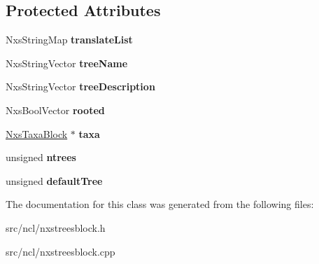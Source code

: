 \subsection*{Protected Attributes}
\begin{DoxyCompactItemize}
\item 
\hypertarget{classNxsTreesBlock_a9b98704435d1d19b44e0413bc683501a}{
NxsStringMap {\bfseries translateList}}
\label{classNxsTreesBlock_a9b98704435d1d19b44e0413bc683501a}

\item 
\hypertarget{classNxsTreesBlock_a783481691f6eb6f76ededc08ef54b88e}{
NxsStringVector {\bfseries treeName}}
\label{classNxsTreesBlock_a783481691f6eb6f76ededc08ef54b88e}

\item 
\hypertarget{classNxsTreesBlock_add8b39382c1adbb4d2be37ddce1d983b}{
NxsStringVector {\bfseries treeDescription}}
\label{classNxsTreesBlock_add8b39382c1adbb4d2be37ddce1d983b}

\item 
\hypertarget{classNxsTreesBlock_a96b97e6ca078dd1405a3bf0a20e3de1f}{
NxsBoolVector {\bfseries rooted}}
\label{classNxsTreesBlock_a96b97e6ca078dd1405a3bf0a20e3de1f}

\item 
\hypertarget{classNxsTreesBlock_aa0e5a09dd29bbcdd4b18b0870e01b2d8}{
\hyperlink{classNxsTaxaBlock}{NxsTaxaBlock} $\ast$ {\bfseries taxa}}
\label{classNxsTreesBlock_aa0e5a09dd29bbcdd4b18b0870e01b2d8}

\item 
\hypertarget{classNxsTreesBlock_a8c3a9f04200ab3d2ed4072cbd636b9c8}{
unsigned {\bfseries ntrees}}
\label{classNxsTreesBlock_a8c3a9f04200ab3d2ed4072cbd636b9c8}

\item 
\hypertarget{classNxsTreesBlock_aeb1d8248a0840568c429776bc0246821}{
unsigned {\bfseries defaultTree}}
\label{classNxsTreesBlock_aeb1d8248a0840568c429776bc0246821}

\end{DoxyCompactItemize}


The documentation for this class was generated from the following files:\begin{DoxyCompactItemize}
\item 
src/ncl/nxstreesblock.h\item 
src/ncl/nxstreesblock.cpp\end{DoxyCompactItemize}
